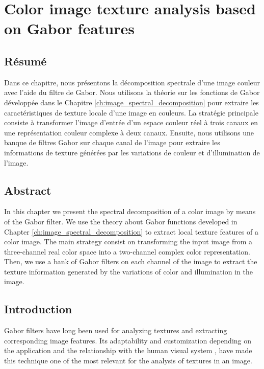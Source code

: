 
\chapter{Color image texture analysis based on Gabor features}
\section*{Résumé}
\noindent Dans ce chapitre, nous présentons la décomposition spectrale d'une image couleur avec l'aide du filtre de Gabor. Nous utilisons la théorie sur les fonctions de Gabor développée dans le Chapitre \ref{ch:image_spectral_decomposition} pour extraire les caractéristiques de texture locale d'une image en couleurs. La stratégie principale consiste à transformer l'image d'entrée d'un espace couleur réel à trois canaux en une représentation couleur complexe à deux canaux. Ensuite, nous utilisons une banque de filtres Gabor sur chaque canal de l'image pour extraire les informations de texture générées par les variations de couleur et d'illumination de l'image.

\section*{Abstract}
\noindent In this chapter we present the spectral decomposition of a color image by means of the Gabor filter. We use the theory about Gabor functions developed in Chapter \ref{ch:image_spectral_decomposition} to extract local texture features of a color image. The main strategy consist on transforming the input image from a three-channel real color space into a two-channel complex color representation. Then, we use a bank of Gabor filters on each channel of the image to extract the texture information generated by the variations of color and illumination in the image.

\section{Introduction}

Gabor filters have long been used for analyzing textures and extracting corresponding image features. Its adaptability and customization depending on the application and the relationship with the human visual system \citep{Daugman:JOSA:1985a}, have made this technique one of the most relevant for the analysis of textures in an image.

